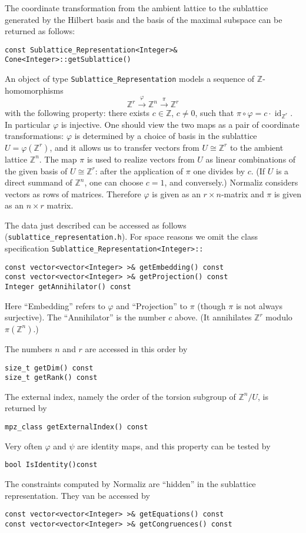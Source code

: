 \documentclass[12pt,a4paper]{scrartcl}
\theoremstyle{definition}
\let\phi=\varphi
\def\ZZ{{\mathbb Z}}
\begin{document}
\begin{small}
The coordinate transformation from the ambient lattice to the sublattice generated by the Hilbert basis and the basis of the maximal subspace can be returned as follows:
\begin{Verbatim}
const Sublattice_Representation<Integer>& Cone<Integer>::getSublattice()
\end{Verbatim}
An object of type \verb|Sublattice_Representation| models a sequence of $\ZZ$-homomorphisms
$$
\ZZ^r\xrightarrow{\phi}\ZZ^n\xrightarrow{\pi}\ZZ^r
$$
with the following property: there exists $c\in\ZZ$, $c\neq 0$, such that $\pi\circ \phi=c\cdot\operatorname{id}_{\ZZ^r}$. In particular $\phi$ is injective. One should view the two maps as a pair of coordinate transformations: $\phi$ is determined by a choice of basis in the sublattice $U=\phi(\ZZ^r)$, and it allows us to transfer vectors from $U\cong \ZZ^r$ to the ambient lattice $\ZZ^n$. The map $\pi$ is used to realize vectors from $U$ as linear combinations of the given basis of $U\cong\ZZ^r$: after the application of $\pi$ one divides by $c$. (If $U$ is a direct summand of $\ZZ^n$, one can choose $c=1$, and conversely.) Normaliz considers vectors as rows of matrices. Therefore $\phi$ is given as an $r\times n$-matrix and $\pi$ is given as an $n\times r$ matrix.

The data just described can be accessed as follows (\verb|sublattice_representation.h|). For space reasons we omit the class specification \verb|Sublattice_Representation<Integer>::|
\begin{Verbatim}
const vector<vector<Integer> >& getEmbedding() const
const vector<vector<Integer> >& getProjection() const
Integer getAnnihilator() const
\end{Verbatim}
Here ``Embedding'' refers to $\phi$ and ``Projection'' to $\pi$ (though $\pi$ is not always surjective). The ``Annihilator'' is the number $c$ above. (It annihilates $\ZZ^r$ modulo $\pi(\ZZ^n)$.)

The numbers $n$ and $r$ are accessed in this order by
\begin{Verbatim}
size_t getDim() const
size_t getRank() const
\end{Verbatim}
The external index, namely the order of the torsion subgroup of $\ZZ^n/U$, is returned by
\begin{Verbatim}
mpz_class getExternalIndex() const
\end{Verbatim}
Very often $\phi$ and $\psi$ are identity maps, and this property can be tested by
\begin{Verbatim}
bool IsIdentity()const
\end{Verbatim}
The constraints computed by Normaliz are ``hidden'' in the sublattice representation. They van be accessed by
\begin{Verbatim}
const vector<vector<Integer> >& getEquations() const
const vector<vector<Integer> >& getCongruences() const
\end{Verbatim}


\end{small}
\end{document}
